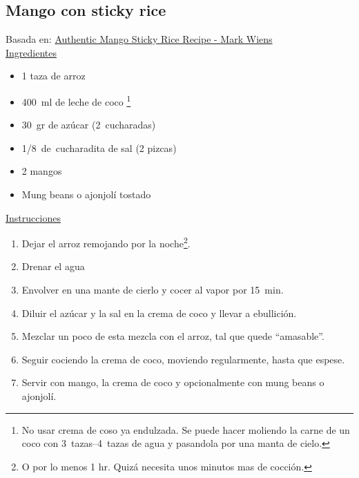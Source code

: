 \subsection{Mango con sticky rice}

Basada en: \href{https://www.youtube.com/watch?v=H_R108b6ZQg}{Authentic Mango Sticky Rice Recipe - Mark Wiens}\\

\underline{Ingredientes}
\begin{itemize}
\item 1 taza de arroz
\item \SI{400}{ml} de leche de coco \footnote{No usar crema de coso ya endulzada. Se puede hacer moliendo la carne de un coco con \SIrange{3}{4}{tazas} de agua y pasandola por una manta de cielo.}
\item \SI{30}{gr} de azúcar (\SI{2}{cucharadas})
\item \SI{1/8}{de~cucharadita} de sal (2 pizcas)
\item 2 mangos
\item Mung beans o ajonjolí tostado
\end{itemize}

\underline{Instrucciones}
\begin{enumerate}
\item Dejar el arroz remojando por la noche\footnote{O por lo menos 1 hr. Quizá necesita unos minutos mas de cocción.}.
\item Drenar el agua
\item Envolver en una mante de cierlo y cocer al vapor por \SI{15}{min}.
\item Diluir el azúcar y la sal en la crema de coco y llevar a ebullición.
\item Mezclar un poco de esta mezcla con el arroz, tal que quede ``amasable''.
\item Seguir cociendo la crema de coco, moviendo regularmente, hasta que espese.
\item Servir con mango, la crema de coco y opcionalmente con mung beans o ajonjolí.
\end{enumerate}